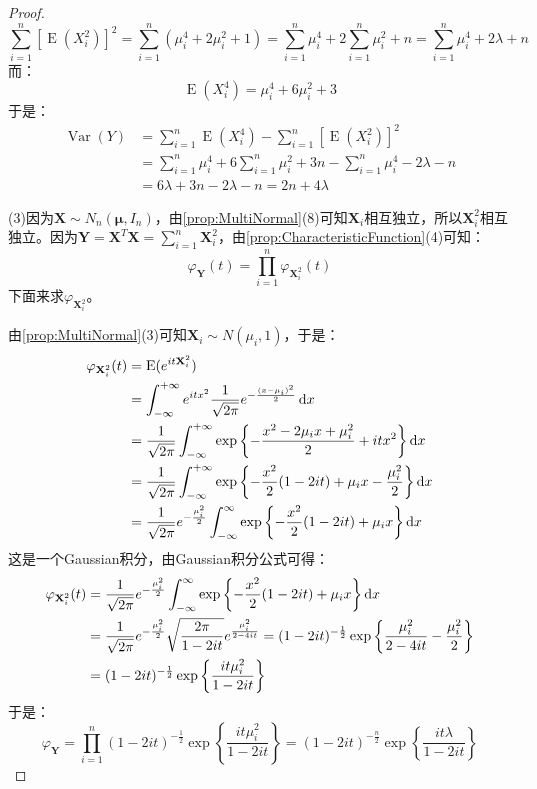 \begin{proof}
\begin{equation*}
		\sum_{i=1}^{n}[\operatorname{E}(X_i^2)]^2=\sum_{i=1}^{n}(\mu_i^4+2\mu_i^2+1)=\sum_{i=1}^{n}\mu_i^4+2\sum_{i=1}^{n}\mu_i^2+n=\sum_{i=1}^{n}\mu_i^4+2\lambda+n
	\end{equation*}
	而：
	\begin{equation*}
		\operatorname{E}(X_i^4)=\mu_i^4+6\mu_i^2+3
	\end{equation*}
	于是：
	\begin{align*}
		\operatorname{Var}(Y)
		&=\sum_{i=1}^{n}\operatorname{E}(X_i^4)-\sum_{i=1}^{n}[\operatorname{E}(X_i^2)]^2 \\
		&=\sum_{i=1}^{n}\mu_i^4+6\sum_{i=1}^{n}\mu_i^2+3n-\sum_{i=1}^{n}\mu_i^4-2\lambda-n \\
		&=6\lambda+3n-2\lambda-n=2n+4\lambda
	\end{align*}\par
	(3)因为$\mathbf{X}\sim N_n(\boldsymbol{\mu},I_n)$，由\cref{prop:MultiNormal}(8)可知$\mathbf{X}_i$相互独立，所以$\mathbf{X}_i^2$相互独立。因为$\mathbf{Y}=\mathbf{X}^T\mathbf{X}=\sum\limits_{i=1}^n\mathbf{X}_i^2$，由\cref{prop:CharacteristicFunction}(4)可知：
	\begin{equation*}
		\varphi_{\mathbf{Y}}(t)=\prod_{i=1}^n\varphi_{\mathbf{X}_i^2}(t)
	\end{equation*}
	下面来求$\varphi_{\mathbf{X}_i^2}$。\par
	由\cref{prop:MultiNormal}(3)可知$\mathbf{X}_i\sim N(\mu_i,1)$，于是：
	\begin{align*}
		\varphi_{\mathbf{X}_i^2}(t)
		&=\operatorname{E}(e^{it\mathbf{X}_i^2}) \\
		&=\int_{-\infty}^{+\infty}e^{itx^2}\frac{1}{\sqrt{2\pi}}e^{-\frac{(x-\mu_i)^2}{2}}\mathop{}\!\mathrm{d} x \\
		&=\frac{1}{\sqrt{2\pi}}\int_{-\infty}^{+\infty}\exp\left\{-\frac{x^2 - 2\mu_ix + \mu_i^2}{2} + itx^2\right\}\mathop{}\!\mathrm{d} x \\
		&=\frac{1}{\sqrt{2\pi}}\int_{-\infty}^{+\infty}\exp\left\{-\frac{x^2}{2} (1 - 2it) + \mu_ix - \frac{\mu_i^2}{2}\right\}\mathop{}\!\mathrm{d} x \\
		&=\frac{1}{\sqrt{2\pi}}e^{-\frac{\mu_i^2}{2}} \int_{-\infty}^{\infty} \exp\left\{-\frac{x^2}{2} (1 - 2it) + \mu_ix\right\}\mathop{}\!\mathrm{d} x
	\end{align*}
	这是一个Gaussian积分，由Gaussian积分公式可得：
	\begin{align*}
		\varphi_{\mathbf{X}_i^2}(t)
		&=\frac{1}{\sqrt{2\pi}}e^{-\frac{\mu_i^2}{2}} \int_{-\infty}^{\infty}\exp\left\{-\frac{x^2}{2} (1 - 2it) + \mu_i x\right\}\mathop{}\!\mathrm{d} x \\
		&=\frac{1}{\sqrt{2\pi}}e^{-\frac{\mu_i^2}{2}}\sqrt{\frac{2\pi}{1-2it}}e^{\frac{\mu_i^2}{2-4it}}
		=(1-2it)^{-\frac{1}{2}}\exp\left\{\frac{\mu_i^2}{2-4it}-\frac{\mu_i^2}{2}\right\} \\
		&=(1-2it)^{-\frac{1}{2}}\exp\left\{\frac{it\mu_i^2}{1-2it}\right\}
	\end{align*}
	于是：
	\begin{equation*}
		\varphi_{\mathbf{Y}}=\prod_{i=1}^n(1-2it)^{-\frac{1}{2}}\exp\left\{\frac{it\mu_i^2}{1-2it}\right\}=(1-2it)^{-\frac{n}{2}}\exp\left\{\frac{it\lambda}{1-2it}\right\}
	\end{equation*}
\end{proof}

